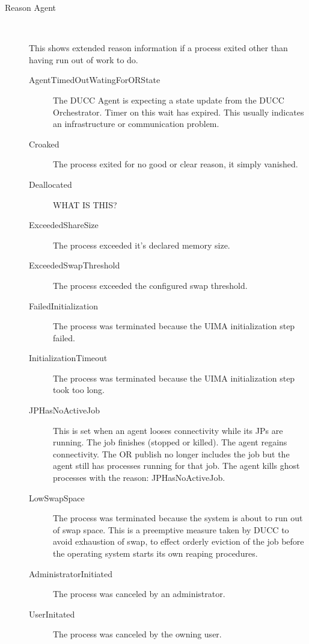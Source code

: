 \begin{description}
          \item[Reason Agent] \hfill \\
          \label{itm:job-details-agent}

          This shows extended reason information if a process exited other than having run out
          of work to do.

            \begin{description}
              \item[AgentTimedOutWatingForORState] The DUCC Agent is expecting a state update
                from the DUCC Orchestrator.  Timer on this wait has expired.  This usually 
                indicates an infrastructure or communication problem.
              \item[Croaked] The process exited for no good or clear reason, it simply vanished.
              \item[Deallocated] WHAT IS THIS?
              \item[ExceededShareSize] The process exceeded it's declared memory size.
              \item[ExceededSwapThreshold] The process exceeded the configured swap threshold.
              \item[FailedInitialization] The process was terminated because the UIMA 
                initialization step failed.
              \item[InitializationTimeout] The process was terminated because the UIMA initialization
                step took too long.
              \item[JPHasNoActiveJob] This is set when an agent looses connectivity while its
                JPs are running. The job finishes (stopped or killed). The agent regains
                connectivity. The OR publish no longer includes the job but the agent still has
                processes running for that job. The agent kills ghost processes with the reason:
                JPHasNoActiveJob.
              \item[LowSwapSpace] The process was terminated because the system is about to run
                out of swap space.  This is a preemptive measure taken by DUCC to avoid exhaustion
                of swap, to effect orderly eviction of the job before the operating system starts
                its own reaping procedures.
              \item[AdministratorInitiated] The process was canceled by an administrator.
              \item[UserInitated] The process was canceled by the owning user.
            \end{description}
            

\end{description}
